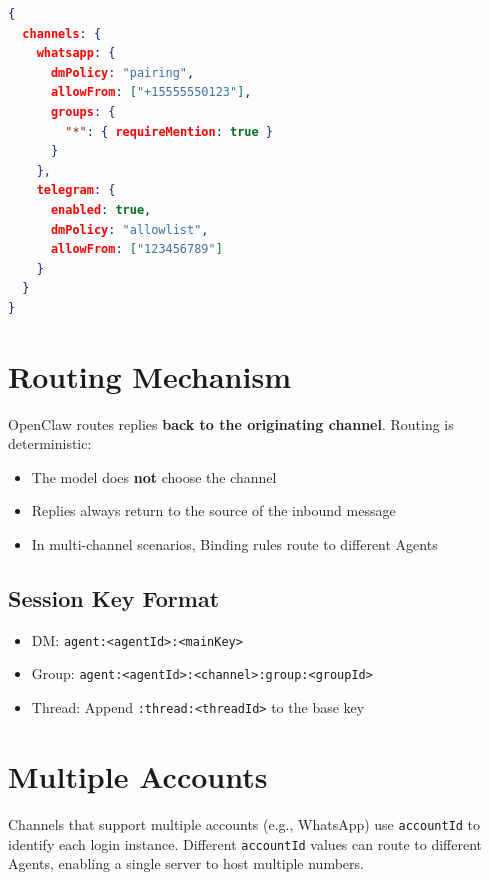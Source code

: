 \begin{lstlisting}[language=json]
{
  channels: {
    whatsapp: {
      dmPolicy: "pairing",
      allowFrom: ["+15555550123"],
      groups: {
        "*": { requireMention: true }
      }
    },
    telegram: {
      enabled: true,
      dmPolicy: "allowlist",
      allowFrom: ["123456789"]
    }
  }
}
\end{lstlisting}

\section{Routing Mechanism}

OpenClaw routes replies \textbf{back to the originating channel}. Routing is deterministic:

\begin{itemize}
  \item The model does \textbf{not} choose the channel
  \item Replies always return to the source of the inbound message
  \item In multi-channel scenarios, Binding rules route to different Agents
\end{itemize}

\subsection{Session Key Format}

\begin{itemize}
  \item DM: \texttt{agent:<agentId>:<mainKey>}
  \item Group: \texttt{agent:<agentId>:<channel>:group:<groupId>}
  \item Thread: Append \texttt{:thread:<threadId>} to the base key
\end{itemize}

\section{Multiple Accounts}

Channels that support multiple accounts (e.g., WhatsApp) use \texttt{accountId} to identify each login instance.
Different \texttt{accountId} values can route to different Agents, enabling a single server to host multiple numbers.
